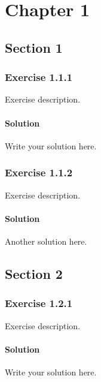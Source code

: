 \section{Chapter 1}

\subsection{Section 1}

\subsubsection*{Exercise 1.1.1}
Exercise description.
\paragraph{Solution}
Write your solution here.

\subsubsection*{Exercise 1.1.2}
Exercise description.
\paragraph{Solution}
Another solution here.

\subsection{Section 2}

\subsubsection*{Exercise 1.2.1}
Exercise description.
\paragraph{Solution}
Write your solution here.

